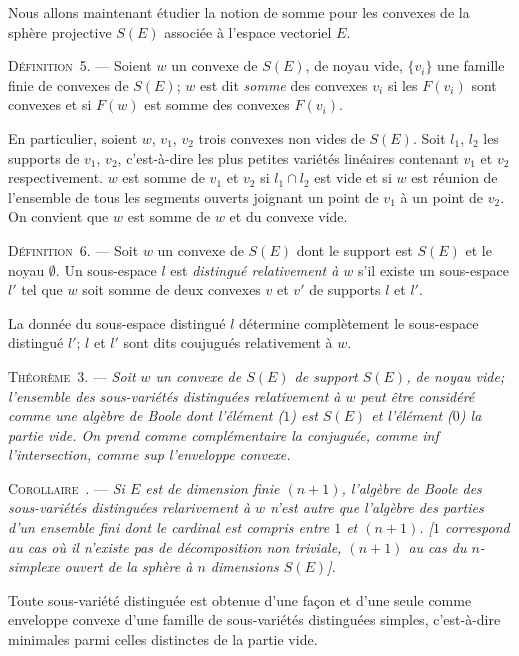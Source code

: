 \documentclass[11pt]{article}
\newcommand{\bznum}[1]{\if\relax\detokenize{#1}\relax\else\ #1\fi}
\newenvironment{defin}[1][]{\par\medskip\noindent\textsc{Définition\bznum{#1}.} --- }{\par\medskip}
\newenvironment{theoreme}[1][]{\par\medskip\noindent\textsc{Théorème\bznum{#1}.} --- \itshape}{\par\medskip}
\newenvironment{corollaire}[1][]{\par\medskip\noindent\textsc{Corollaire\bznum{#1}.} --- \itshape}{\par\medskip}
\begin{document}
Nous allons maintenant étudier la notion de somme pour les convexes de la sphère projective
$S(E)$ associée à l'espace vectoriel $E$.

\begin{defin}[5]
Soient $w$ un convexe de $S(E)$, de noyau vide, $\{v_i\}$ une famille finie de convexes de $S(E)$;
$w$ est dit \textit{somme} des convexes $v_i$ si les $F(v_i)$ sont convexes et si $F(w)$ est
somme des convexes $F(v_i)$.

En particulier, soient $w$, $v_1$, $v_2$ trois convexes non vides de $S(E)$. Soit $l_1$, $l_2$
les supports de $v_1$, $v_2$, c'est-à-dire les plus petites variétés linéaires contenant $v_1$ et
$v_2$ respectivement. $w$ est somme de $v_1$ et $v_2$ si $l_1\cap l_2$ est vide et si $w$ est
réunion de l'ensemble de tous les segments ouverts joignant un point de $v_1$ à un point de
$v_2$. On convient que $w$ est somme de $w$ et du convexe vide.
\end{defin}

\begin{defin}[6]
Soit $w$ un convexe de $S(E)$ dont le support est $S(E)$ et le noyau $\emptyset$. Un sous-espace
$l$ est \textit{distingué relativement à $w$} s'il existe un sous-espace $l'$ tel que $w$ soit
somme de deux convexes $v$ et $v'$ de supports $l$ et $l'$.

La donnée du sous-espace distingué $l$ détermine complètement le sous-espace distingué $l'$; $l$
et $l'$ sont dits coujugués relativement à $w$.
\end{defin}

\begin{theoreme}[3]
Soit $w$ un convexe de $S(E)$ de support $S(E)$, de noyau vide; l'ensemble des sous-variétés
distinguées relativement à $w$ peut être considéré comme une algèbre de Boole dont l'élément
\textup{(}$1$\textup{)} est $S(E)$ et l'élément \textup{(}$0$\textup{)} la partie vide. On prend
comme complémentaire la conjuguée, comme \textup{inf} l'intersection, comme \textup{sup}
l'enveloppe convexe.
\end{theoreme}

\begin{corollaire}
Si $E$ est de dimension finie $(n+1)$, l'algèbre de Boole des sous-variétés distinguées
relarivement à $w$ n'est autre que l'algèbre des parties d'un ensemble fini dont le cardinal est
compris entre $1$ et $(n+1)$. [$1$ correspond au cas où il n'existe pas de décomposition non
triviale, $(n+1)$ au cas du $n$-simplexe ouvert de la sphère à $n$ dimensions $S(E)$].

Toute sous-variété distinguée est obtenue d'une façon et d'une seule comme enveloppe convexe d'une
famille de sous-variétés distinguées simples, c'est-à-dire minimales parmi celles distinctes de la
partie vide.
\end{corollaire}
\end{document}
